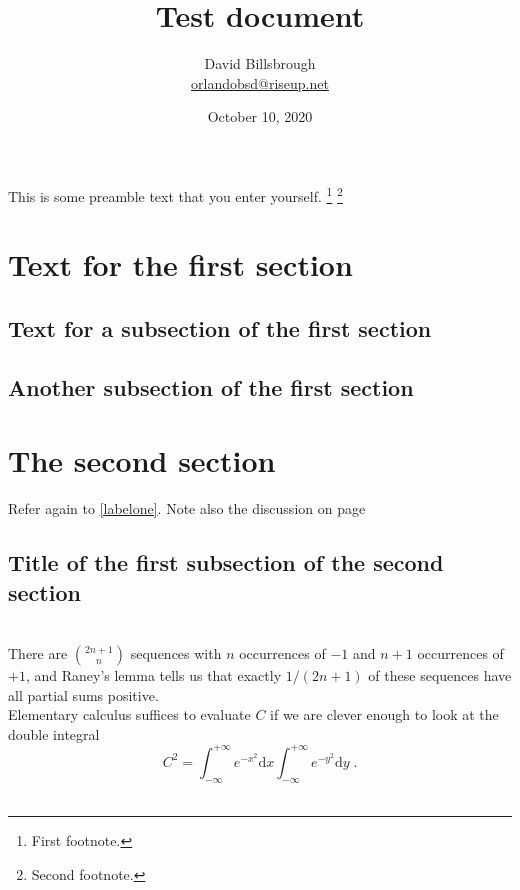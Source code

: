 \documentclass{article}
\title{Test  document}
\author{David Billsbrough \\ \url{orlandobsd@riseup.net}}
\date {October 10, 2020}
\begin{document}
\maketitle
\tableofcontents
\newpage

This is some  preamble  text  that  you  enter  yourself.
\footnote{First  footnote.}
\footnote{Second  footnote.}

\section{Text  for the  first  section}
\lipsum [1]

\subsection{Text  for a subsection  of the  first  section}
\lipsum [2-3]
\label{labelone}

\subsection{Another  subsection  of the  first  section}
\lipsum [4-5]
\label{labeltwo}

\section{The  second  section}
\lipsum [6]

Refer  again to \ref{labelone}. \cite{ConcreteMath}
Note  also  the  discussion  on page \pageref{labeltwo}

\subsection{Title of the  first  subsection  of the  second  section}
\lipsum [7]
\\

There  are $\binom{2n+1}{n}$ sequences with $n$ occurrences of $-1$ and $n+1$ occurrences of $+1$, and Raney’s lemma
tells us that exactly $1/(2n+1)$ of these sequences have all partial sums positive.
\\

Elementary calculus suffices to evaluate $C$ if we are clever enough to look at the double integral
\begin{equation*}
  C^2
    =\int_{-\infty }^{+\infty} e^{-x^2} \mathrm{d}x
       \int_{-\infty }^{+\infty} e^{-y^2} \mathrm{d}y\;.
\end{equation*}
\\
\end{document}
